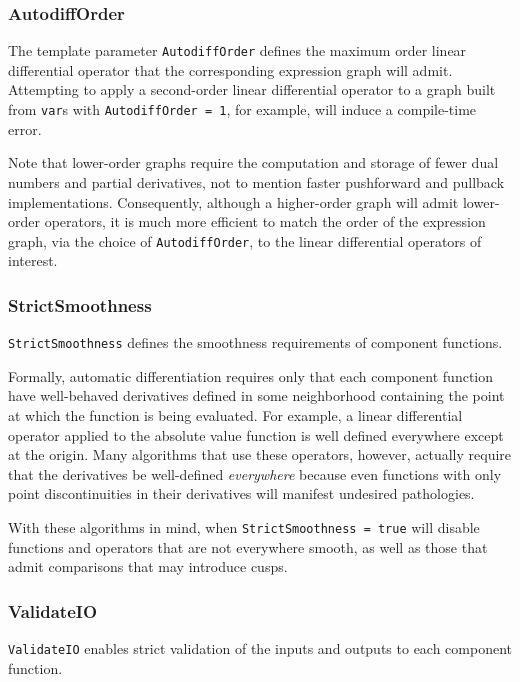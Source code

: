 \subsubsection{AutodiffOrder}

The template parameter \verb|AutodiffOrder| defines the maximum order
linear differential operator that the corresponding expression graph will
admit.  Attempting to apply a second-order linear differential operator
to a graph built from \verb|var|s with \verb|AutodiffOrder = 1|, for example,
will induce a compile-time error.

Note that lower-order graphs require the computation and storage of
fewer dual numbers and partial derivatives, not to mention faster pushforward
and pullback implementations.  Consequently, although a higher-order
graph will admit lower-order operators, it is much more efficient to match
the order of the expression graph, via the choice of \verb|AutodiffOrder|,
to the linear differential operators of interest.

\subsubsection{StrictSmoothness}

\verb|StrictSmoothness| defines the smoothness requirements of 
component functions.

Formally, automatic differentiation requires only that each component
function have well-behaved derivatives defined in some neighborhood
containing the point at which the function is being evaluated.  For
example, a linear differential operator applied to the absolute value
function is well defined everywhere except at the origin.  Many
algorithms that use these operators, however, actually require that
the derivatives be well-defined \textit{everywhere} because even 
functions with only point discontinuities in their derivatives will
manifest undesired pathologies.

With these algorithms in mind, when \verb|StrictSmoothness = true| 
\nomad will disable functions and operators that are not everywhere 
smooth, as well as those that admit comparisons that may introduce cusps.

\subsubsection{ValidateIO}

\verb|ValidateIO| enables strict validation of the inputs and outputs
to each component function.


